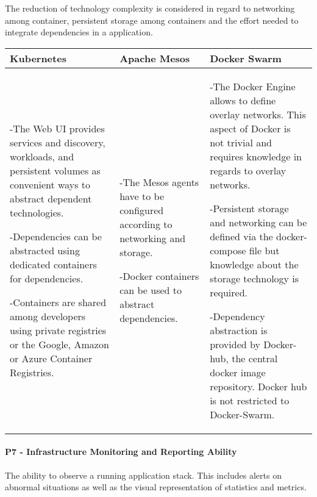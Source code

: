 The reduction of technology complexity is considered in regard to networking
among container, persistent storage among containers and the effort needed to
integrate dependencies in a application.

\begin{center}
  \begin{tabular}{ | p{4.5cm} | p{4.5cm} | p{4.5cm} | }
    \hline
    \textbf{Kubernetes}&\textbf{Apache Mesos}&\textbf{Docker Swarm}\\\hline
    -The Web UI provides services and discovery, workloads, and persistent
    volumes as convenient ways to abstract dependent technologies.
    
    -Dependencies can be abstracted using dedicated containers for dependencies.
    
    -Containers are shared among developers using private registries
    or the Google, Amazon or Azure Container Registries.&
    
    -The Mesos agents have to be configured according to networking and storage.
    
    -Docker containers can be used to abstract dependencies. & 
    
    -The Docker Engine allows to define overlay networks. This aspect of
    Docker is not trivial and requires knowledge in regards to overlay
    networks.
    
    -Persistent storage and networking can be defined via the docker-compose
    file but knowledge about the storage technology is required.
    
    -Dependency abstraction is provided by Docker-hub, the central docker image
    repository. Docker hub is not restricted to Docker-Swarm.\\
    \hline
  \end{tabular}
\end{center}

\newpage
\paragraph{P7 - Infrastructure Monitoring and Reporting Ability}

The ability to observe a running \ms{} application stack. This includes alerts
on abnormal situations as well as the visual representation of statistics and
metrics.

